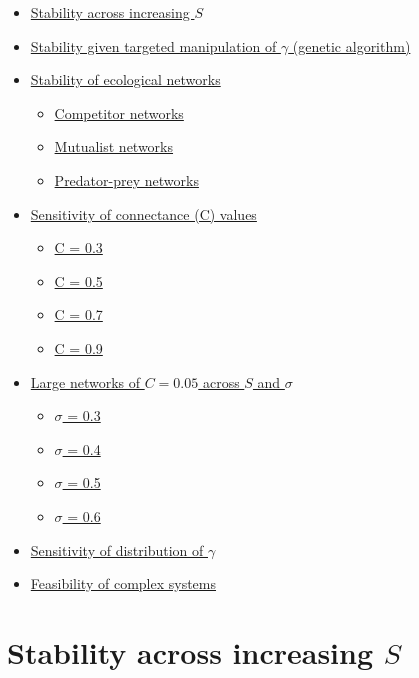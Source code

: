 \documentclass[]{article}
\providecommand{\tightlist}{%
  \setlength{\itemsep}{0pt}\setlength{\parskip}{0pt}}
\begin{document}
\begin{itemize}
\tightlist
\item
  \protect\hyperlink{IncrS}{Stability across increasing \(S\)}
\item
  \protect\hyperlink{ga}{Stability given targeted manipulation of
  \(\gamma\) (genetic algorithm)}
\item
  \protect\hyperlink{ecological}{Stability of ecological networks}

  \begin{itemize}
  \tightlist
  \item
    \protect\hyperlink{competition}{Competitor networks}
  \item
    \protect\hyperlink{mutualism}{Mutualist networks}
  \item
    \protect\hyperlink{pred-prey}{Predator-prey networks}
  \end{itemize}
\item
  \protect\hyperlink{connectance}{Sensitivity of connectance (C) values}

  \begin{itemize}
  \tightlist
  \item
    \protect\hyperlink{connect3}{C = 0.3}
  \item
    \protect\hyperlink{connect5}{C = 0.5}
  \item
    \protect\hyperlink{connect7}{C = 0.7}
  \item
    \protect\hyperlink{connect9}{C = 0.9}
  \end{itemize}
\item
  \protect\hyperlink{sigma}{Large networks of \(C = 0.05\) across \(S\)
  and \(\sigma\)}

  \begin{itemize}
  \tightlist
  \item
    \protect\hyperlink{sigma3}{\(\sigma\) = 0.3}
  \item
    \protect\hyperlink{sigma4}{\(\sigma\) = 0.4}
  \item
    \protect\hyperlink{sigma5}{\(\sigma\) = 0.5}
  \item
    \protect\hyperlink{sigma6}{\(\sigma\) = 0.6}
  \end{itemize}
\item
  \protect\hyperlink{gam_dist}{Sensitivity of distribution of
  \(\gamma\)}
\item
  \protect\hyperlink{Feasibility}{Feasibility of complex systems}
\end{itemize}

\hypertarget{IncrS}{\section{\texorpdfstring{Stability across increasing
\(S\)}{Stability across increasing S}}\label{IncrS}}
\end{document}
